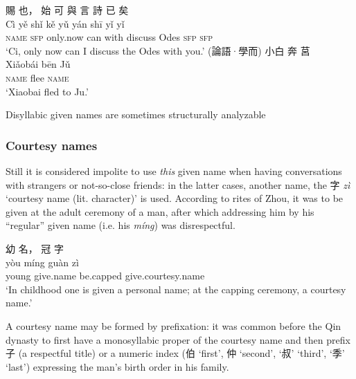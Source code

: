 \documentclass[UTF8, a4paper, oneside, scheme=plain, 12pt]{ctexrep}
\newcommand{\form}[1]{\emph{#1}}
\newcommand{\translate}[1]{`#1'}
\newcommand*{\category}[1]{\textsc{#1}}
\begin{document}
\begin{exe}
    \ex\label{ex:nouns.proper-nouns.person.given.monosyllabic.1}
    \glll 賜 也， 始 可 與 言 詩 已 矣 \\
    Cì yě shǐ kě yǔ yán shī yǐ yǐ \\
    \category{name} \category{sfp} only.now can with discuss Odes \category{sfp} \category{sfp} \\
    \glt\translate{Ci, only now can I discuss the Odes with you.} \hfill (論語·學而)
    \ex\label{ex:nouns.proper-nouns.person.given.disyllabic.1}
    \glll 小白 奔 莒 \\
    Xiǎobái bēn Jǔ \\
    \category{name} flee \category{name} \\
    \glt\translate{Xiaobai fled to Ju.}
\end{exe}



Disyllabic given names are sometimes structurally analyzable 

\subsubsection{Courtesy names}

Still it is considered impolite to use \emph{this} given name when having conversations with strangers or not-so-close friends:
in the latter cases, another name, the 字 \form{zì} \translate{courtesy name (lit. character)} is used.
According to rites of Zhou,
it was to be given at the adult ceremony of a man,
after which addressing him by his ``regular'' given name (i.e. his \form{míng}) was disrespectful.

\begin{exe}
    \ex
    \glll 幼 名， 冠 字 \\
    yòu míng guàn zì \\
    young give.name be.capped give.courtesy.name \\
    \glt\translate{In childhood one is given a personal name; at the capping ceremony, a courtesy name.}
\end{exe}



A courtesy name may be formed by prefixation:
it was common before the Qin dynasty to first have a monosyllabic proper of the courtesy name
and then prefix 子 (a respectful title) or a numeric index (伯 \translate{first}, 仲 \translate{second}, \translate{叔} \translate{third}, \translate{季} \translate{last}) expressing the man's birth order in his family.
\end{document}
